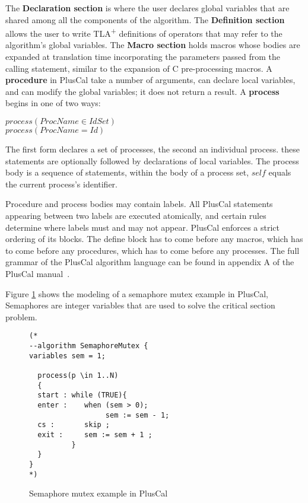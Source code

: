 \documentclass[journal]{IEEEtran}
\newcommand{\tlaplus}{TLA\textsuperscript{+}\xspace}
\begin{document}
The \textbf{Declaration section} is where the user declares global variables that are shared among all the components of the algorithm. The \textbf{Definition section} allows the user to write \tlaplus definitions of operators that may refer to the algorithm's global variables.
The \textbf{Macro section} holds macros whose bodies are expanded at translation time incorporating the parameters passed from the calling statement, similar to the expansion of C pre-processing macros. A \textbf{procedure} in PlusCal take a number of arguments, can declare local variables, and can modify the global variables; it does not return a result. A \textbf{process} begins in one of two ways: 
\begin{center}
$process (ProcName \in IdSet)$ \\
$process (ProcName = Id)$
\end{center}

The first form declares a set of processes, the second an individual process. these statements are optionally followed by declarations of local variables. The process body is a sequence of statements, within the body of a process set, $self$ equals the current process's identifier.

Procedure and process bodies may contain labels. All PlusCal statements appearing between two labels are executed atomically, and certain rules determine where labels must and may not appear.
PlusCal enforces a strict ordering of its blocks. The define block has to come before any macros, which has to come before any procedures, which has to come before any processes. The full grammar of the PlusCal algorithm language can be found in appendix A of the PlusCal manual~\cite{pcalAlgo}.

Figure \ref{semaphoreEx} shows the modeling of a semaphore mutex example in PlusCal, Semaphores are integer variables that are used to solve the critical section problem.


\begin{figure}
\begin{lstlisting}[frame = tlrb, firstnumber = 1]
(*
--algorithm SemaphoreMutex {
variables sem = 1;
 
  process(p \in 1..N)
  {
  start : while (TRUE){
  enter :    when (sem > 0);
                  sem := sem - 1;            
  cs :       skip ;
  exit :     sem := sem + 1 ;
          }
  }
}
*)

\end{lstlisting}
\caption{Semaphore mutex example in PlusCal}
\label{semaphoreEx}
\end{figure} 
\end{document}
